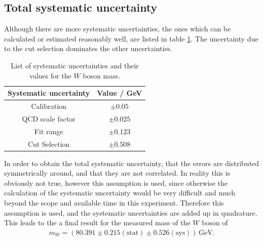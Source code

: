 \subsection{Total systematic uncertainty}
    Although there are more systematic uncertainties, the ones which can be calculated or estimated reasonably well, are listed in table \ref{tab:uncertainties}.
    The uncertainty due to the cut selection dominates the other uncertainties.
    \begin{table}
        \centering
        \begin{tabular}{cc}
            \toprule
            Systematic uncertainty & Value / GeV \\
            \midrule
            Calibration & $\pm 0.05$ \\
            QCD scale factor & $\pm 0.025$ \\
            Fit range  & $\pm 0.123$ \\
            Cut Selection & $\pm 0.508$ \\
            \bottomrule
        \end{tabular}
            \caption{List of systematic uncertainties and their values for the $W$ boson mass.}
            \label{tab:uncertainties}
    \end{table}
    In order to obtain the total systematic uncertainty, that the errors are distributed symmetrically around, and that they are not correlated. In reality this is 
    obviously not true, however this assumption is used, since otherwise the calculation of the systematic uncertainty would be very difficult and much beyond the scope
    and available time in this experiment. Therefore this assumption is used, and the systematic uncertainties are added up in quadrature. This leads to the a final
    result for the measured mass of the $W$ boson of 
    \begin{align*}
        m_W = (80.391 \pm 0.215(\mathrm{stat}) \pm 0.526 (\mathrm{sys}))\,\mathrm{GeV}.
    \end{align*}